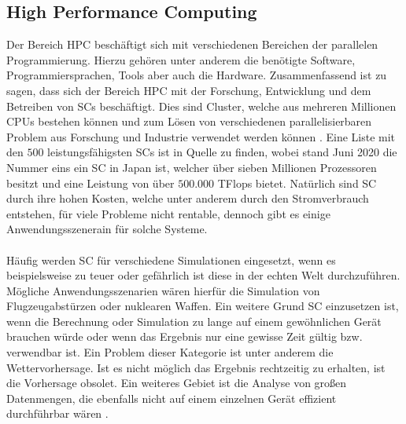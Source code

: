 \subsection{High Performance Computing}
Der Bereich \ac{HPC} beschäftigt sich mit verschiedenen Bereichen der parallelen Programmierung. Hierzu gehören unter anderem die benötigte Software, Programmiersprachen, Tools aber auch die Hardware. Zusammenfassend ist zu sagen, dass sich der Bereich \ac{HPC} mit der Forschung, Entwicklung und dem Betreiben von \acp{SC} beschäftigt. Dies sind Cluster, welche aus mehreren Millionen \acp{CPU} bestehen können und zum Lösen von verschiedenen parallelisierbaren Problem aus Forschung und Industrie verwendet werden können \cite{nielsen2016introduction}. Eine Liste mit den $500$ leistungsfähigsten \acp{SC} ist in Quelle \cite{top500} zu finden, wobei stand Juni 2020 die Nummer eins ein \ac{SC} in Japan ist, welcher über sieben Millionen Prozessoren besitzt und eine Leistung von über $500.000$ TFlops bietet. Natürlich sind \ac{SC} durch ihre hohen Kosten, welche unter anderem durch den Stromverbrauch entstehen, für viele Probleme nicht rentable,  dennoch gibt es einige Anwendungsszenerain für solche Systeme.
\\\\
Häufig werden \ac{SC} für verschiedene Simulationen eingesetzt, wenn es beispielsweise zu teuer oder gefährlich ist diese in der echten Welt durchzuführen. Mögliche Anwendungsszenarien wären hierfür die Simulation von Flugzeugabstürzen oder nuklearen Waffen. 
Ein weitere Grund \ac{SC} einzusetzen ist, wenn die Berechnung oder Simulation zu lange auf einem gewöhnlichen Gerät brauchen würde oder wenn das Ergebnis nur eine gewisse Zeit gültig bzw. verwendbar ist. Ein Problem dieser Kategorie ist unter anderem die Wettervorhersage. Ist es nicht möglich das Ergebnis rechtzeitig zu erhalten, ist die Vorhersage obsolet. Ein weiteres Gebiet ist die Analyse von großen Datenmengen, die ebenfalls nicht auf einem einzelnen Gerät effizient durchführbar wären \cite{nielsen2016introduction}.

